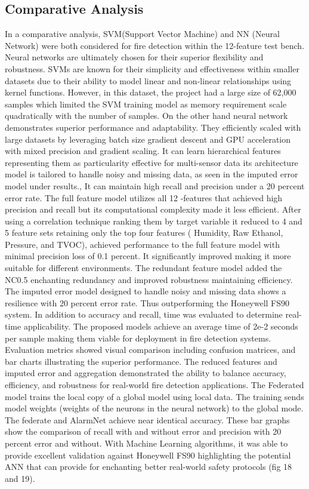 \documentclass[conference]{IEEEtran}
\begin{document}
\subsection{Comparative Analysis}
In a comparative analysis, SVM(Support Vector Machine) and
NN (Neural Network) were both considered for fire detection
within the 12-feature test bench. Neural networks are
ultimately chosen for their superior flexibility and
robustness. SVMs are known for their simplicity and
effectiveness within smaller datasets due to their ability
to model linear and non-linear relationships using kernel
functions. However, in this dataset, the project had a large
size of 62,000 samples which limited the SVM training model
as memory requirement scale quadratically with the number of
samples. On the other hand neural network demonstrates
superior performance and adaptability. They efficiently
scaled with large datasets by leveraging batch size gradient
descent and GPU acceleration with mixed precision and
gradient scaling. It can learn hierarchical features
representing them as particularity effective for
multi-sensor data its architecture model is tailored to
handle noisy and missing data, as seen in the imputed error
model under results., It can maintain high recall and
precision under a 20 percent error rate. The full feature
model utilizes all 12 -features that achieved high precision
and recall but its computational complexity made it less
efficient. After using a correlation technique ranking them
by target variable it reduced to 4 and 5 feature sets
retaining only the top four features ( Humidity, Raw
Ethanol, Pressure, and TVOC), achieved performance to the
full feature model with minimal precision loss of 0.1
percent. It significantly improved making it more suitable
for different environments. The redundant feature model
added the NC0.5 enchanting redundancy and improved
robustness maintaining efficiency. The imputed error model
designed to handle noisy and missing data shows a resilience
with 20 percent error rate. Thus outperforming the Honeywell
FS90 system. In addition to accuracy and recall, time was
evaluated to determine real-time applicability. The proposed
models achieve an average time of 2e-2 seconds per sample
making them viable for deployment in fire detection systems.
Evaluation metrics showed visual comparison including
confusion matrices, and bar charts illustrating the superior
performance. The reduced features and imputed error and
aggregation demonstrated the ability to balance accuracy,
efficiency, and robustness for real-world fire detection
applications. The Federated model trains the local copy of a
global model using local data. The training sends model
weights (weights of the neurons in the neural network) to
the global mode. The federate and AlarmNet achieve near
identical accuracy. These bar graphs show the comparison of
recall with and without error and precision with 20 percent
error and without. With Machine Learning algorithms, it was
able to provide excellent validation against Honeywell FS90
highlighting the potential ANN that can provide for
enchanting better real-world safety protocols (fig 18 and
19). 
\end{document}
